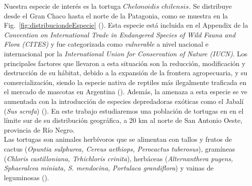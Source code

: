 Nuestra especie de interés es la tortuga $Chelonoidis$ $chilensis$. Se distribuye desde el Gran Chaco hasta el norte de la Patagonia, como se muestra en la Fig.~\ref{fig:distribuciondeEspecie} (\cite{chebez2008se}). Esta especie está incluida en el Appendix  de la \textit{Convention on International Trade in Endangered Species of Wild Fauna and Flora (CITES)} y fue categorizada como \textit{vulnerable} a nivel nacional \cite{prado2012categorizacion} e internacional por la \textit{International Union for Conservation of Nature (IUCN)}.
Los principales factores que llevaron a esta situación son la reducción, modificación y destrucción de su hábitat, debido a la expansión de la frontera agropecuaria, y su comercialización, siendo la especie nativa de reptiles más ilegalmente traficada en el mercado de mascotas en Argentina (\cite{prado2012categorizacion}). Además, la amenaza a esta especie se ve aumentada con la introducción de especies depredadoras exóticas como el Jabalí (\textit{Sus scrofa}) (\cite{kubisch2014chelonoidis}). En este trabajo estudiaremos una población de tortugas en en el límite sur de su distribución geográfica, a 20 km al norte de San Antonio Oeste, provincia de Río Negro.  \\
    
Las tortugas son animales  herbívoros que se alimentan con tallos y frutos de cactus (\textit{Opuntia sulphurea, Cereus aethiops, Perocactus tuberosus}), gramíneas (\textit{Chloris castilloniana, Trhichloris crinita}), herbáceas (\textit{Alternanthera pugens, Sphaeralcea miniata, S. mendocina, Portulaca grandiflora}) y vainas de leguminosas (\cite{zacarias2016biologia}).
    
    
    
